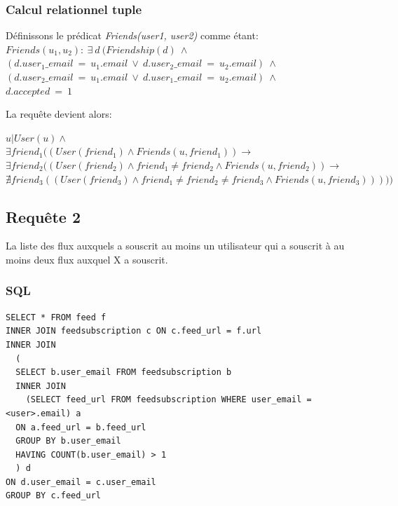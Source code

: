 \documentclass[a4paper,10pt]{article}
\begin{document}
\subsubsection{Calcul relationnel tuple}
Définissons le prédicat \emph{Friends(user1, user2)} comme étant:
\\
      $Friends(u_1, u_2):\ \exists\ d\ (Friendship(d)\ \wedge $\\
      $(d.user_1\_email\ =\ u_1.email\ \vee\ d.user_2\_email\ =\ u_2.email)\ \wedge $\\
      $(d.user_2\_email\ =\ u_1.email\ \vee\ d.user_1\_email\ =\ u_2.email)\ \wedge $\\
      $d.accepted\ =\ 1$

La requête devient alors:

       $u | User(u) \wedge$ \\
       $\exists friend_1 ((User(friend_1) \wedge Friends(u, friend_1)) \rightarrow$ \\
       $\exists friend_2 ((User(friend_2) \wedge friend_1 \neq friend_2 \wedge Friends(u, friend_2)) \rightarrow$ \\
       $\nexists friend_3 ((User(friend_3) \wedge friend_1 \neq friend_2 \neq friend_3 \wedge Friends(u, friend_3)))))$
\clearpage
\subsection{Requête 2}
La liste des flux auxquels a souscrit au moins un utilisateur qui a souscrit à au moins deux flux auxquel X
a souscrit.
\subsubsection{SQL}
\begin{lstlisting}
SELECT * FROM feed f
INNER JOIN feedsubscription c ON c.feed_url = f.url
INNER JOIN 
  (
  SELECT b.user_email FROM feedsubscription b 
  INNER JOIN 
    (SELECT feed_url FROM feedsubscription WHERE user_email = <user>.email) a
  ON a.feed_url = b.feed_url 
  GROUP BY b.user_email
  HAVING COUNT(b.user_email) > 1
  ) d
ON d.user_email = c.user_email
GROUP BY c.feed_url
\end{lstlisting}
\end{document}
